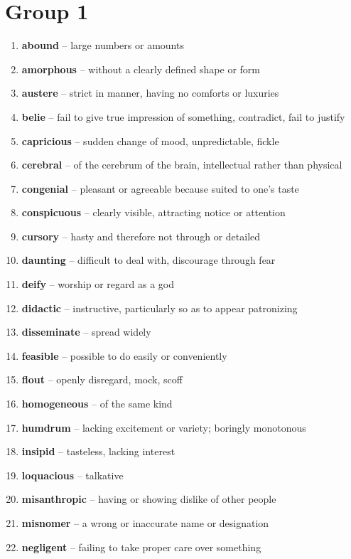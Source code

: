 \newpage
\section{Group 1}

\begin{enumerate}[wide,labelindent=0pt]
\item \textbf{abound} -- large numbers or amounts
\item \textbf{amorphous} -- without a clearly defined shape or form
\item \textbf{austere} -- strict in manner, having no comforts or luxuries
\item \textbf{belie} -- fail to give true impression of something, contradict, fail to justify
\item \textbf{capricious} -- sudden change of mood, unpredictable, fickle
\item \textbf{cerebral} -- of the cerebrum of the brain, intellectual rather than physical
\item \textbf{congenial} -- pleasant or agreeable because suited to one's taste
\item \textbf{conspicuous} -- clearly visible, attracting notice or attention
\item \textbf{cursory} -- hasty and therefore not through or detailed
\item \textbf{daunting} -- difficult to deal with, discourage through fear
\item \textbf{deify} -- worship or regard as a god
\item \textbf{didactic} -- instructive, particularly so as to appear patronizing
\item \textbf{disseminate} -- spread widely
\item \textbf{feasible} -- possible to do easily or conveniently
\item \textbf{flout} -- openly disregard, mock, scoff
\item \textbf{homogeneous} -- of the same kind
\item \textbf{humdrum} -- lacking excitement or variety; boringly monotonous
\item \textbf{insipid} -- tasteless, lacking interest
\item \textbf{loquacious} -- talkative
\item \textbf{misanthropic} -- having or showing dislike of other people
\item \textbf{misnomer} -- a wrong or inaccurate name or designation
\item \textbf{negligent} -- failing to take proper care over something

\end{enumerate}
